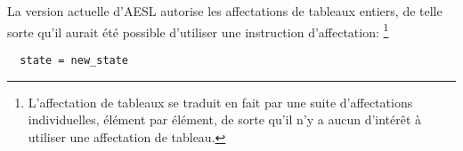 La version actuelle d'AESL autorise les affectations de tableaux entiers, de telle sorte qu'il
aurait été possible d'utiliser une instruction d'affectation:
\footnote{L'affectation de tableaux se traduit en fait par une suite d'affectations individuelles,
élément par élément, de sorte qu'il n'y a aucun d'intérêt à utiliser une affectation de tableau.}

\begin{footnotesize}
\begin{verbatim}
  state = new_state
\end{verbatim}
\end{footnotesize}
